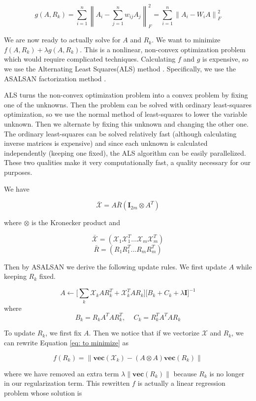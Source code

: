 \documentclass[pageno]{jpaper}
\newcommand{\norm}[1]{\left\lVert#1\right\rVert}
\begin{document}
\begin{equation}
    \label{eq: new g}
    g(A, R_k) = \sum_{i=1}^n \norm{A_i - \sum_{j=1}^n w_{ij}A_j}_F^2 =
    \sum_{i=1}^n \norm{A_i - W_iA}_F^2
\end{equation}

We are now ready to actually solve for $A$ and $R_k$. We want to minimize $f(A,
R_k) + \lambda g(A, R_k)$. This is a nonlinear, non-convex optimization problem
which would require complicated techniques. Calculating $f$ and $g$ is
expensive, so we use the Alternating Least Squares(ALS) method \cite{Koren2009}.
Specifically, we use the ASALSAN factorization method \cite{Bader2007}.

ALS turns the non-convex optimization problem into a convex problem by fixing
one of the unknowns. Then the problem can be solved with ordinary least-squares
optimization, so we use the normal method of least-squares to lower the
variable unknown. Then we alternate by fixing this unknown and changing the
other one. The ordinary least-squares can be solved relatively fast (although
calculating inverse matrices is expensive) and since each unknown is calculated
independently (keeping one fixed), the ALS algorithm can be easily parallelized.
These two qualities make it very computationally fast, a quality necessary for
our purposes.

We have

$$\bar{\mathcal{X}} = A\bar{R}(\mathbf{I}_{2m} \otimes A^T)$$

where $\otimes$ is the Kronecker product and

$$\bar{\mathcal{X}} = \left( \mathcal{X}_1\mathcal{X}_1^T ... \mathcal{X}_m\mathcal{X}_m^T \right)$$
$$\bar{R} = \left( R_1 R_1^T ... R_mR_m^T \right)$$

Then by ASALSAN we derive the following update rules. We first update $A$ while
keeping $R_k$ fixed.

$$A \leftarrow \bigg[ \sum_k \mathcal{X}_kAR_k^T + \mathcal{X}_k^TAR_k \bigg] \bigg[ B_k + C_k + \lambda\mathbf{I} \bigg]^{-1}$$
where
$$B_k = R_k A^T AR_k^T,\,\,\,\,\,\,\, C_k = R_k^TA^TAR_k$$

To update $R_k$, we first fix $A$. Then we notice that if we vectorize
$\mathcal{X}$ and $R_k$, we can rewrite Equation \ref{eq: to minimize} as

$$f(R_k) = \norm{\textbf{vec}\left(\mathcal{X}_k\right) - \left(A \otimes A \right)
\textbf{vec}\left(R_k\right)}$$

where we have removed an extra term $\lambda \norm{\textbf{vec}(R_k)}$ because
$R_k$ is no longer in our regularization term. This rewritten $f$ is actually
a linear regression problem whose solution is
\end{document}
